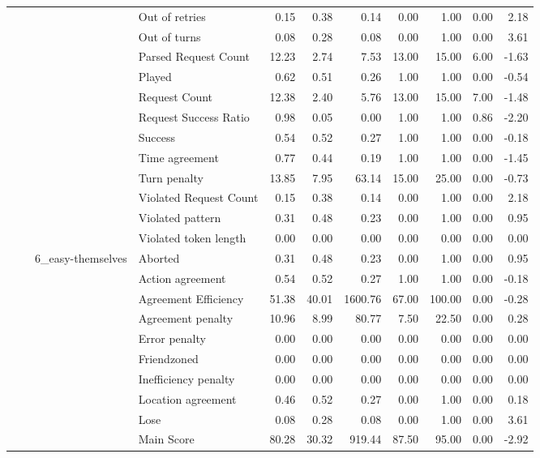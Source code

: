 \begin{tabular}{llllrrrrrrr}
 &  &  & Out of retries & 0.15 & 0.38 & 0.14 & 0.00 & 1.00 & 0.00 & 2.18 \\
 &  &  & Out of turns & 0.08 & 0.28 & 0.08 & 0.00 & 1.00 & 0.00 & 3.61 \\
 &  &  & Parsed Request Count & 12.23 & 2.74 & 7.53 & 13.00 & 15.00 & 6.00 & -1.63 \\
 &  &  & Played & 0.62 & 0.51 & 0.26 & 1.00 & 1.00 & 0.00 & -0.54 \\
 &  &  & Request Count & 12.38 & 2.40 & 5.76 & 13.00 & 15.00 & 7.00 & -1.48 \\
 &  &  & Request Success Ratio & 0.98 & 0.05 & 0.00 & 1.00 & 1.00 & 0.86 & -2.20 \\
 &  &  & Success & 0.54 & 0.52 & 0.27 & 1.00 & 1.00 & 0.00 & -0.18 \\
 &  &  & Time agreement & 0.77 & 0.44 & 0.19 & 1.00 & 1.00 & 0.00 & -1.45 \\
 &  &  & Turn penalty & 13.85 & 7.95 & 63.14 & 15.00 & 25.00 & 0.00 & -0.73 \\
 &  &  & Violated Request Count & 0.15 & 0.38 & 0.14 & 0.00 & 1.00 & 0.00 & 2.18 \\
 &  &  & Violated pattern & 0.31 & 0.48 & 0.23 & 0.00 & 1.00 & 0.00 & 0.95 \\
 &  &  & Violated token length & 0.00 & 0.00 & 0.00 & 0.00 & 0.00 & 0.00 & 0.00 \\
\cline{3-11}
 &  & \multirow[t]{27}{*}{6_easy-themselves} & Aborted & 0.31 & 0.48 & 0.23 & 0.00 & 1.00 & 0.00 & 0.95 \\
 &  &  & Action agreement & 0.54 & 0.52 & 0.27 & 1.00 & 1.00 & 0.00 & -0.18 \\
 &  &  & Agreement Efficiency & 51.38 & 40.01 & 1600.76 & 67.00 & 100.00 & 0.00 & -0.28 \\
 &  &  & Agreement penalty & 10.96 & 8.99 & 80.77 & 7.50 & 22.50 & 0.00 & 0.28 \\
 &  &  & Error penalty & 0.00 & 0.00 & 0.00 & 0.00 & 0.00 & 0.00 & 0.00 \\
 &  &  & Friendzoned & 0.00 & 0.00 & 0.00 & 0.00 & 0.00 & 0.00 & 0.00 \\
 &  &  & Inefficiency penalty & 0.00 & 0.00 & 0.00 & 0.00 & 0.00 & 0.00 & 0.00 \\
 &  &  & Location agreement & 0.46 & 0.52 & 0.27 & 0.00 & 1.00 & 0.00 & 0.18 \\
 &  &  & Lose & 0.08 & 0.28 & 0.08 & 0.00 & 1.00 & 0.00 & 3.61 \\
 &  &  & Main Score & 80.28 & 30.32 & 919.44 & 87.50 & 95.00 & 0.00 & -2.92 \\

\end{tabular}
